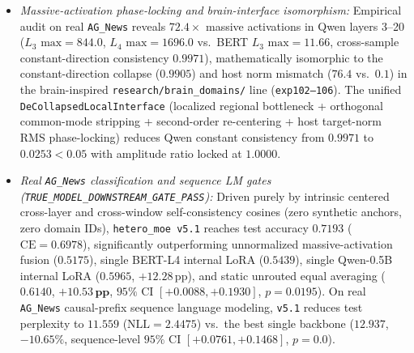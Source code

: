 \documentclass[10pt]{article}
\theoremstyle{definition}
\theoremstyle{plain}
\theoremstyle{remark}
\begin{document}
\begin{enumerate}[leftmargin=1.6em, itemsep=1pt, parsep=0pt]
\begin{itemize}[leftmargin=1.4em, itemsep=0.5pt, parsep=0pt]
        \item \emph{Massive-activation phase-locking and brain-interface isomorphism:} Empirical audit on real \texttt{AG\_News} reveals $72.4\times$ massive activations in Qwen layers 3--20 ($L_3\text{ max}=844.0$, $L_4\text{ max}=1696.0$ vs.\ BERT $L_3\text{ max}=11.66$, cross-sample constant-direction consistency $0.9971$), mathematically isomorphic to the constant-direction collapse ($0.9905$) and host norm mismatch ($76.4$ vs.\ $0.1$) in the brain-inspired \texttt{research/brain\_domains/} line (\texttt{exp102--106}). The unified \texttt{DeCollapsedLocalInterface} (localized regional bottleneck + orthogonal common-mode stripping + second-order re-centering + host target-norm RMS phase-locking) reduces Qwen constant consistency from $0.9971$ to $\mathbf{0.0253} < 0.05$ with amplitude ratio locked at $\mathbf{1.0000}$.
        \item \emph{Real \texttt{AG\_News} classification and sequence LM gates (\texttt{TRUE\_MODEL\_DOWNSTREAM\_GATE\_PASS}):} Driven purely by intrinsic centered cross-layer and cross-window self-consistency cosines (zero synthetic anchors, zero domain IDs), \texttt{hetero\_moe v5.1} reaches test accuracy $\mathbf{0.7193}$ ($\mathrm{CE}=0.6978$), significantly outperforming unnormalized massive-activation fusion ($0.5175$), single BERT-L4 internal LoRA ($0.5439$), single Qwen-0.5B internal LoRA ($0.5965$, $+12.28\,\text{pp}$), and static unrouted equal averaging ($0.6140$, $\mathbf{+10.53\,\text{pp}}$, $95\%$ CI $[+0.0088, +0.1930]$, $p{=}0.0195$). On real \texttt{AG\_News} causal-prefix sequence language modeling, \texttt{v5.1} reduces test perplexity to $\mathbf{11.559}$ ($\mathrm{NLL}=2.4475$) vs.\ the best single backbone ($12.937$, $\mathbf{-10.65\%}$, sequence-level $95\%$ CI $[+0.0761, +0.1468]$, $p{=}0.0$).
    \end{itemize}
\end{enumerate}
\end{document}
